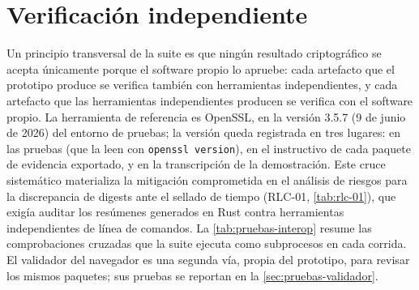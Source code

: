 
\section{Verificación independiente}\label{sec:pruebas-interop}

Un principio transversal de la suite es que ningún resultado criptográfico se acepta únicamente porque el software propio lo apruebe: cada artefacto que el prototipo produce se verifica también con herramientas independientes, y cada artefacto que las herramientas independientes producen se verifica con el software propio. La herramienta de referencia es OpenSSL, en la versión 3.5.7 (9 de junio de 2026) del entorno de pruebas; la versión queda registrada en tres lugares: en las pruebas (que la leen con \texttt{openssl version}), en el instructivo de cada paquete de evidencia exportado, y en la transcripción de la demostración. Este cruce sistemático materializa la mitigación comprometida en el análisis de riesgos para la discrepancia de digests ante el sellado de tiempo (RLC-01, \cref{tab:rlc-01}), que exigía auditar los resúmenes generados en Rust contra herramientas independientes de línea de comandos. La \cref{tab:pruebas-interop} resume las comprobaciones cruzadas que la suite ejecuta como subprocesos en cada corrida. El validador del navegador es una segunda vía, propia del prototipo, para revisar los mismos paquetes; sus pruebas se reportan en la \cref{sec:pruebas-validador}.

